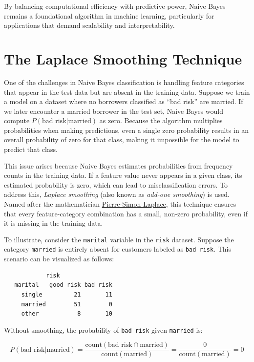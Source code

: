 \documentclass[
  11pt,
]{book}
\newcommand{\passthrough}[1]{#1}
\theoremstyle{definition}
\theoremstyle{definition}
\theoremstyle{definition}
\theoremstyle{definition}
\theoremstyle{remark}
\begin{document}
By balancing computational efficiency with predictive power, Naive Bayes remains a foundational algorithm in machine learning, particularly for applications that demand scalability and interpretability.

\section{The Laplace Smoothing Technique}\label{the-laplace-smoothing-technique}

One of the challenges in Naive Bayes classification is handling feature categories that appear in the test data but are absent in the training data. Suppose we train a model on a dataset where no borrowers classified as ``bad risk'' are married. If we later encounter a married borrower in the test set, Naive Bayes would compute \(P(\text{bad risk} | \text{married})\) as zero. Because the algorithm multiplies probabilities when making predictions, even a single zero probability results in an overall probability of zero for that class, making it impossible for the model to predict that class.

This issue arises because Naive Bayes estimates probabilities from frequency counts in the training data. If a feature value never appears in a given class, its estimated probability is zero, which can lead to misclassification errors. To address this, \emph{Laplace smoothing} (also known as \emph{add-one smoothing}) is used. Named after the mathematician \href{https://en.wikipedia.org/wiki/Pierre-Simon_Laplace}{Pierre-Simon Laplace}, this technique ensures that every feature-category combination has a small, non-zero probability, even if it is missing in the training data.

To illustrate, consider the \passthrough{\lstinline!marital!} variable in the \passthrough{\lstinline!risk!} dataset. Suppose the category \passthrough{\lstinline!married!} is entirely absent for customers labeled as \passthrough{\lstinline!bad risk!}. This scenario can be visualized as follows:

\begin{lstlisting}
            risk
   marital   good risk bad risk
     single         21       11
     married        51        0
     other           8       10
\end{lstlisting}

Without smoothing, the probability of \passthrough{\lstinline!bad risk!} given \passthrough{\lstinline!married!} is:

\[
P(\text{bad risk} | \text{married}) = \frac{\text{count}(\text{bad risk} \cap \text{married})}{\text{count}(\text{married})} = \frac{0}{\text{count}(\text{married})} = 0
\]
\end{document}
